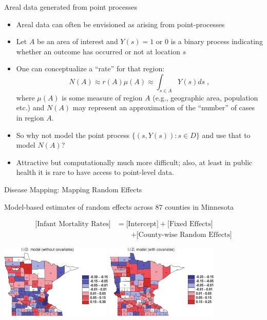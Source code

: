 \documentclass[10pt]{beamer}
\begin{document}
\begin{frame}{Areal data generated from point processes}

\begin{itemize}
 \item Areal data can often be envisioned as arising from point-processes
 
 \item Let $A$ be an area of interest and $Y(s) = 1$ or $0$ is a binary process indicating whether an outcome has occurred or not at location $s$
 
 \item One can conceptualize a ``rate'' for that region:
 \[
  N(A)\approx r(A)\mu(A)\approx \int_{s\in A} Y(s)ds\;, 
 \]
 where $\mu(A)$ is some measure of region $A$ (e.g., geographic area, population etc.) and $N(A)$ may represent an approximation of the ``number'' of cases in region $A$.
 
 \item So why not model the point process $\{(s, Y(s)): s\in D\}$ and use that to model $N(A)$?
 
 \item Attractive but computationally much more difficult; also, at least in public health it is rare to have access to point-level data. 
\end{itemize}
 
\end{frame}

\begin{frame}{Disease Mapping: Mapping Random Effects}

Model-based estimates of random effects across $87$ counties in Minnesota

{\small
\begin{align*}
 \mbox{[Infant Mortality Rates]} &= \mbox{[Intercept]} + \mbox{[Fixed Effects]} \\
 &\qquad + \mbox{[County-wise Random Effects]}
\end{align*}
}

\begin{center}
\includegraphics[width=0.4\textwidth, height=0.4\textheight]{figs/BWC_IID_Without_Covariates}
\includegraphics[width=0.4\textwidth, height=0.4\textheight]{figs/BWC_IID_With_Covariates}
\end{center}

\end{frame}
\end{document}
